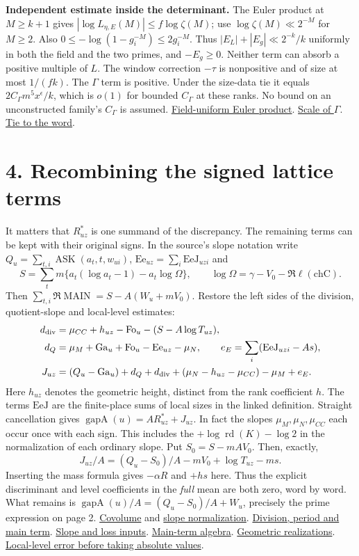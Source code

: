 \documentclass[11pt]{article}
\newcommand{\base}{https://github.com/Deicyde/riemann-hypothesis/blob/e7c8972c701d3396947808ab20cc16dc14623d33/src/}
\newcommand{\pin}[3]{\href{\base#1.lean\##2}{#3}}
\newcommand{\schur}{Formalism/SharpRestriction/GlobalSchurBounds/}
\newcommand{\gap}{\operatorname{gapA}}
\newcommand{\rd}{\operatorname{rd}}
\newcommand{\Ask}{\operatorname{ASK}}
\newcommand{\Main}{\operatorname{MAIN}}
\begin{document}
\textbf{Independent estimate inside the determinant.}
The Euler product at $M\ge k+1$ gives $|\log L_{\eta,E}(M)|\le f\log\zeta(M)$; use $\log\zeta(M)\ll2^{-M}$ for $M\ge2$. Also $0\le-\log(1-g_i^{-M})\le2g_i^{-M}$. Thus $|E_L|+|E_g|\ll 2^{-k}/k$ uniformly in both the field and the two primes, and $-E_g\ge0$. Neither term can absorb a positive multiple of $L$. The window correction $-\tau$ is nonpositive and of size at most $1/(fk)$. The $\Gamma$ term is positive. Under the size-data tie it equals $2C_\Gamma m^5x^\epsilon/k$, which is $o(1)$ for bounded $C_\Gamma$ at these ranks. No bound on an unconstructed family's $C_\Gamma$ is assumed.
\pin{\schur ThickPlacesCorollaryOfAnyTranslate}{L46-L55}{Field-uniform Euler product}.
\pin{\schur Chosen}{L12-L15}{Scale of $\Gamma$}. \pin{\schur TopDensityNGeSixteen}{L78-L83}{Tie to the word}.

\newpage
\section*{4. Recombining the signed lattice terms}
It matters that $R^*_{uz}$ is one summand of the discrepancy. The remaining terms can be kept with their original signs. In the source's slope notation write $Q_u=\sum_{t,i}\Ask(a_t,t,w_{ui})$,
$\mathrm{Ee}_{uz}=\sum_i\mathrm{EeJ}_{uzi}$ and
\[
 S=\sum_t m\{a_t(\log a_t-1)-a_t\log\Omega\},\qquad
 \log\Omega=\gamma -V_0-\Re\ell(\mathrm{chC}).
\]
Then $\sum_{t,i}\Re\Main=S-A(W_u+mV_0)$. Restore the left sides of the division, quotient-slope and local-level estimates:
\begin{align*}
 d_{\rm div}&=\mu_{CC}+h_{uz}-\mathrm{Fo}_u-(S-A\log T_{uz}),\\
 d_Q&=\mu_M+\mathrm{Ga}_u+\mathrm{Fo}_u-\mathrm{Ee}_{uz}-\mu_N,\qquad
 e_E=\sum_i(\mathrm{EeJ}_{uzi}-As),\\
 J_{uz}&=(Q_u-\mathrm{Ga}_u)+d_Q+d_{\rm div}
             +(\mu_N-h_{uz}-\mu_{CC})-\mu_M+e_E .
\end{align*}
Here $h_{uz}$ denotes the geometric height, distinct from the rank coefficient $h$. The terms $\mathrm{EeJ}$ are the finite-place sums of local sizes in the linked definition. Straight cancellation gives $\gap(u)=A R^*_{uz}+J_{uz}$. In fact the slopes $\mu_M,\mu_N,\mu_{CC}$ each occur once with each sign. This includes the $+\log\rd(K)-\log2$ in the normalization of each ordinary slope. Put $S_0=S-mAV_0$. Then, exactly,
\[
 J_{uz}/A=(Q_u-S_0)/A-mV_0+\log T_{uz}-ms.
\]
Inserting the mass formula gives $-\alpha R$ and $+hs$ here. Thus the explicit discriminant and level coefficients in the \emph{full} mean are both zero, word by word. What remains is $\gap(u)/A=(Q_u-S_0)/A+W_u$, precisely the prime expression on page 2. \pin{Formalism/HarderNarasimhan/StatementPl}{L25-L32}{Covolume} and \pin{Formalism/HarderNarasimhan/StatementPl}{L64-L68}{slope normalization}.
\pin{Formalism/RankGapBounds/MeanBoundSecondForm}{L84-L125}{Division, period and main term}.
\pin{Formalism/RankGapBounds/MeanBoundSecondForm}{L139-L150}{Slope and loss inputs}.
\pin{Formalism/RankGapBounds/RankGapProofs/WeightedMeanData}{L170-L216}{Main-term algebra}.
\pin{\schur QuadraticLogDerivCongr}{L478-L497}{Geometric realizations}.
\pin{\schur QuadraticLogDerivCongr}{L594-L624}{Local-level error before taking absolute values}.
\end{document}
